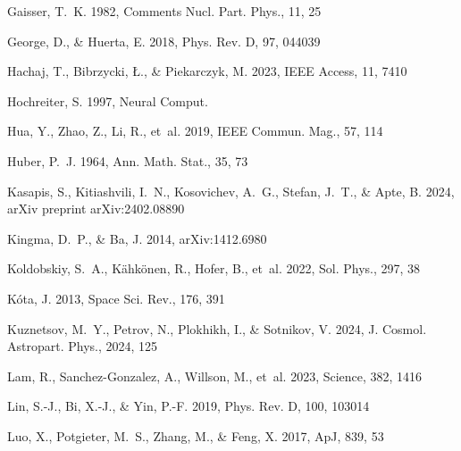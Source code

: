 \documentclass[twocolumn,,12pt]{aastex631}
\begin{document}
\begin{thebibliography}{99}
Gaisser, T.~K. 1982, Comments Nucl. Part. Phys., 11, 25

George, D., \& Huerta, E. 2018, Phys. Rev. D, 97, 044039

Hachaj, T., Bibrzycki, {\L}., \& Piekarczyk, M. 2023, IEEE Access, 11, 7410

Hochreiter, S. 1997, Neural Comput.

Hua, Y., Zhao, Z., Li, R., {et~al.} 2019, IEEE Commun. Mag., 57, 114

Huber, P.~J. 1964, Ann. Math. Stat., 35, 73

Kasapis, S., Kitiashvili, I.~N., Kosovichev, A.~G., Stefan, J.~T., \& Apte, B.
  2024, arXiv preprint arXiv:2402.08890

Kingma, D.~P., \& Ba, J. 2014, arXiv:1412.6980

Koldobskiy, S.~A., K{\"a}hk{\"o}nen, R., Hofer, B., {et~al.} 2022, Sol. Phys.,
  297, 38

K{\'o}ta, J. 2013, Space Sci. Rev., 176, 391

Kuznetsov, M.~Y., Petrov, N., Plokhikh, I., \& Sotnikov, V. 2024, J. Cosmol.
  Astropart. Phys., 2024, 125

Lam, R., Sanchez-Gonzalez, A., Willson, M., {et~al.} 2023, Science, 382, 1416

Lin, S.-J., Bi, X.-J., \& Yin, P.-F. 2019, Phys. Rev. D, 100, 103014

Luo, X., Potgieter, M.~S., Zhang, M., \& Feng, X. 2017, ApJ, 839, 53


\end{thebibliography}
\end{document}
